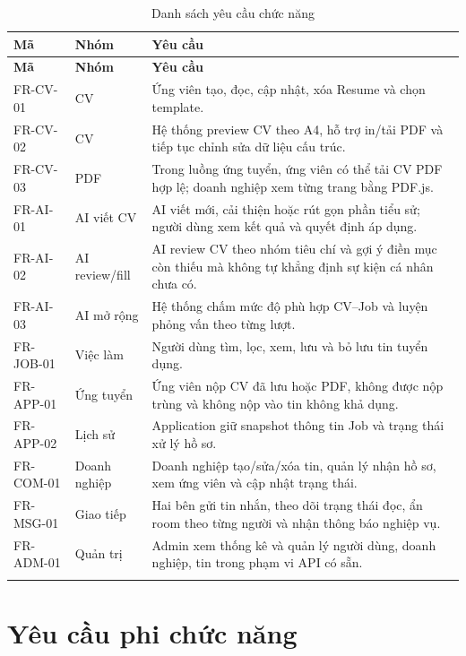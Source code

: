 \begin{longtable}{|p{}|p{}|p{}|}
    \hline
    \textbf{Mã} & \textbf{Nhóm} & \textbf{Yêu cầu} \\ \hline
    \endfirsthead
    \hline
    \textbf{Mã} & \textbf{Nhóm} & \textbf{Yêu cầu} \\ \hline
    \endhead
    FR-CV-01 & CV & Ứng viên tạo, đọc, cập nhật, xóa Resume và chọn template. \\ \hline
    FR-CV-02 & CV & Hệ thống preview CV theo A4, hỗ trợ in/tải PDF và tiếp tục chỉnh sửa dữ liệu cấu trúc. \\ \hline
    FR-CV-03 & PDF & Trong luồng ứng tuyển, ứng viên có thể tải CV PDF hợp lệ; doanh nghiệp xem từng trang bằng PDF.js. \\ \hline
    FR-AI-01 & AI viết CV & AI viết mới, cải thiện hoặc rút gọn phần tiểu sử; người dùng xem kết quả và quyết định áp dụng. \\ \hline
    FR-AI-02 & AI review/fill & AI review CV theo nhóm tiêu chí và gợi ý điền mục còn thiếu mà không tự khẳng định sự kiện cá nhân chưa có. \\ \hline
    FR-AI-03 & AI mở rộng & Hệ thống chấm mức độ phù hợp CV--Job và luyện phỏng vấn theo từng lượt. \\ \hline
    FR-JOB-01 & Việc làm & Người dùng tìm, lọc, xem, lưu và bỏ lưu tin tuyển dụng. \\ \hline
    FR-APP-01 & Ứng tuyển & Ứng viên nộp CV đã lưu hoặc PDF, không được nộp trùng và không nộp vào tin không khả dụng. \\ \hline
    FR-APP-02 & Lịch sử & Application giữ snapshot thông tin Job và trạng thái xử lý hồ sơ. \\ \hline
    FR-COM-01 & Doanh nghiệp & Doanh nghiệp tạo/sửa/xóa tin, quản lý nhận hồ sơ, xem ứng viên và cập nhật trạng thái. \\ \hline
    FR-MSG-01 & Giao tiếp & Hai bên gửi tin nhắn, theo dõi trạng thái đọc, ẩn room theo từng người và nhận thông báo nghiệp vụ. \\ \hline
    FR-ADM-01 & Quản trị & Admin xem thống kê và quản lý người dùng, doanh nghiệp, tin trong phạm vi API có sẵn. \\ \hline
\caption{Danh sách yêu cầu chức năng}
\label{tab:functional-requirements}
\end{longtable}

\section{Yêu cầu phi chức năng}

